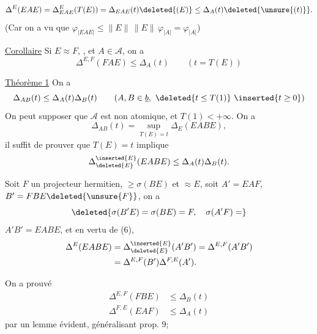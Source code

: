 \[
\Delta^E(EAE)=\Delta_{EAE}^E(T(E))
=\Delta_{EAE}(t)\deleted{(E)}\leq\Delta_A(t)\deleted{\unsure{(t)}}.
\]
(Car on a vu que $\varphi_{|EAE|}\leq\|E\|\,\|E\|\,\varphi_{|A|}=\varphi_{|A|}$)

\uline{Corollaire} Si $E\approx F$, , et $A\in\mathcal A$, on a
\[
\Delta^{E,F}(FAE)\leq\Delta_A(t)\qquad(t=T(E))
\]

\uline{Théorème 1} On a
\[
\Delta_{AB}(t)\leq\Delta_A(t)\Delta_B(t)
\qquad(A,B\in\underline b,\ \deleted{t\leq T(1)}\ \inserted{t\geq0})
\]
On peut supposer que $\mathcal A$ est non atomique, et $T(1)<+\infty$. On a
\[
\Delta_{AB}(t)=\sup_{T(E)=t}\Delta_E(EABE),
\]
il suffit de prouver que $T(E)=t$ implique
\[
\Delta_{\deleted{E}}^{\inserted{E}}(EABE)\leq\Delta_A(t)\Delta_B(t).
\]

Soit $F$ un projecteur hermitien, $\geq\sigma(BE)$ et $\approx E$, soit $A'=EAF$, $B'=FBE\deleted{\unsure{F}}$, on a
\[
\deleted{\sigma(B'E)=\sigma(BE)=F,\quad\sigma(A'F)=}
\]
$A'B'=EABE$, et en vertu de (6),
\[
\begin{aligned}
\Delta^E(EABE)&=\Delta_{\deleted{E}}^{\inserted{E}}(A'B')
=\Delta^{E,F}(A'B')\\
&=\Delta^{E,F}(B')\Delta^{F,E}(A').
\end{aligned}
\]



On a prouvé
\[
\begin{aligned}
\Delta^{E,F}(FBE)&\leq\Delta_B(t)\\
\Delta^{F,E}(EAF)&\leq\Delta_A(t)
\end{aligned}
\]
par un lemme évident, généralisant prop. 9;
